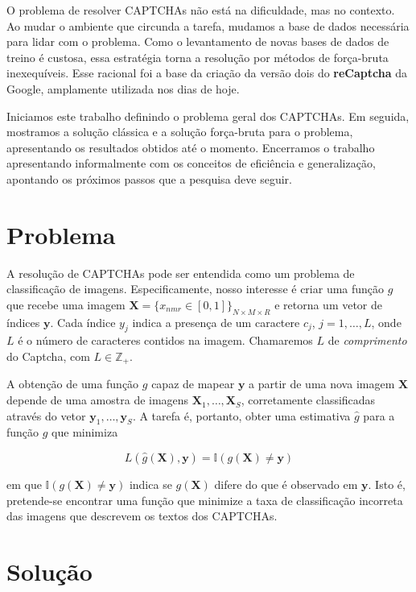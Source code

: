 \documentclass[]{elsarticle} %
\begin{document}
O problema de resolver CAPTCHAs não está na dificuldade, mas no contexto. Ao mudar o ambiente que circunda a tarefa, mudamos a base de dados necessária para lidar com o problema. Como o levantamento de novas bases de dados de treino é custosa, essa estratégia torna a resolução por métodos de força-bruta inexequíveis. Esse racional foi a base da criação da versão dois do \textbf{reCaptcha} da Google, amplamente utilizada nos dias de hoje.

Iniciamos este trabalho definindo o problema geral dos CAPTCHAs. Em seguida, mostramos a solução clássica e a solução força-bruta para o problema, apresentando os resultados obtidos até o momento. Encerramos o trabalho apresentando informalmente com os conceitos de eficiência e generalização, apontando os próximos passos que a pesquisa deve seguir.

\hypertarget{problema}{%
\section{Problema}\label{problema}}

A resolução de CAPTCHAs pode ser entendida como um problema de classificação de imagens. Especificamente, nosso interesse é criar uma função \(g\) que recebe uma imagem \(\mathbf X = \{x_{nmr} \in [0,1]\}_{N\times M \times R}\) e retorna um vetor de índices \(\mathbf y\). Cada índice \(y_j\) indica a presença de um caractere \(c_j\), \(j = 1, \dots, L\), onde \(L\) é o número de caracteres contidos na imagem. Chamaremos \(L\) de \emph{comprimento} do Captcha, com \(L \in \mathbb{Z}_+\).

A obtenção de uma função \(g\) capaz de mapear \(\mathbf y\) a partir de uma nova imagem \(\mathbf X\) depende de uma amostra de imagens \(\mathbf X_1, \dots, \mathbf X_S\), corretamente classificadas
através do vetor \(\mathbf y_1, \dots, \mathbf y_S\). A tarefa é, portanto, obter uma estimativa \(\hat g\) para a função \(g\) que minimiza

\[
L(\hat g(\mathbf X), \mathbf y) = \mathbb I(g(\mathbf X) \neq \mathbf y)
\]

em que \(\mathbb I(g(\mathbf X) \neq \mathbf y)\) indica se \(g(\mathbf X)\) difere
do que é observado em \(\mathbf y\). Isto é, pretende-se encontrar uma função que minimize a taxa de classificação incorreta das imagens que descrevem os textos dos CAPTCHAs.

\hypertarget{results}{%
\section{Solução}\label{results}}
\end{document}
